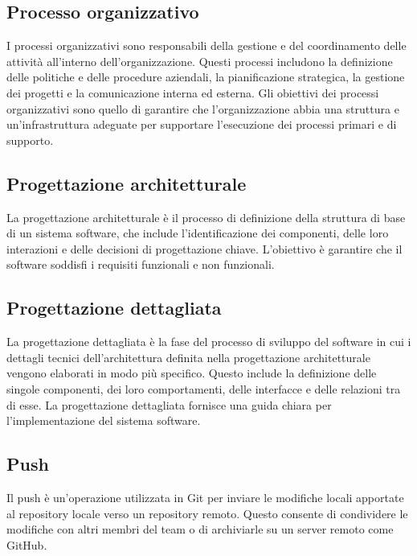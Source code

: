 \subsection{Processo organizzativo} 
I processi organizzativi sono responsabili della gestione e del coordinamento delle attività all'interno dell'organizzazione. Questi processi includono la definizione delle politiche e delle procedure aziendali, la pianificazione strategica, la gestione dei progetti e la comunicazione interna ed esterna. Gli obiettivi dei processi organizzativi sono quello di garantire che l'organizzazione abbia una struttura e un'infrastruttura adeguate per supportare l'esecuzione dei processi primari e di supporto.
\subsection{Progettazione architetturale} 
La progettazione architetturale è il processo di definizione della struttura di base di un sistema software, che include l'identificazione dei componenti, delle loro interazioni e delle decisioni di progettazione chiave. L'obiettivo è garantire che il software soddisfi i requisiti funzionali e non funzionali. 
\subsection{Progettazione dettagliata} 
La progettazione dettagliata è la fase del processo di sviluppo del software in cui i dettagli tecnici dell'architettura definita nella progettazione architetturale vengono elaborati in modo più specifico. Questo include la definizione delle singole componenti, dei loro comportamenti, delle interfacce e delle relazioni tra di esse. La progettazione dettagliata fornisce una guida chiara per l'implementazione del sistema software. 
\subsection{Push} 
Il push è un'operazione utilizzata in Git per inviare le modifiche locali apportate al repository locale verso un repository remoto. Questo consente di condividere le modifiche con altri membri del team o di archiviarle su un server remoto come GitHub. 

